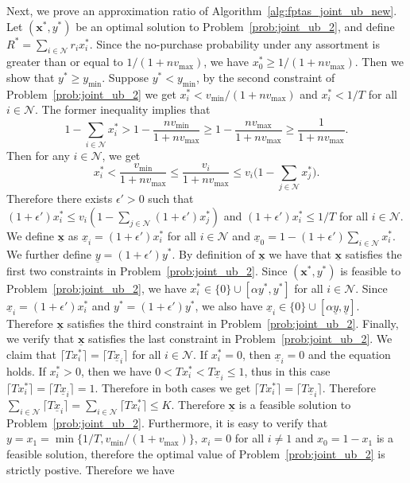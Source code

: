 \documentclass[mnsc,non-blindrev]{informs3}
\theoremstyle{definition}
\begin{document}
\begin{appendices}{\Large{}}
{Next, we prove an approximation ratio of Algorithm~\ref{alg:fptas_joint_ub_new}. Let $(\bm{x}^*,y^*)$ be an optimal solution to Problem~\eqref{prob:joint_ub_2}, and define $R^*=\sum_{i\in\mathcal{N}}r_ix_i^*$. Since the no-purchase probability under any assortment is greater than or equal to $1/(1+nv_{\max})$, we have $x_0^*\geq 1/(1+nv_{\max})$. Then we show that $y^*\geq y_{\min}$. Suppose $y^*<y_{\min}$, by the second constraint of Problem~\eqref{prob:joint_ub_2} we get $x_i^*<v_{\min}/(1+nv_{\max})$ and $x_i^*<1/T$ for all $i\in\mathcal{N}$. The former inequality implies that
\begin{equation*}
1-\sum_{i\in\mathcal{N}}x_i^*>1-\dfrac{nv_{\min}}{1+nv_{\max}}\geq 1-\dfrac{nv_{\max}}{1+nv_{\max}}\geq \dfrac{1}{1+nv_{\max}}.
\end{equation*}
Then for any $i\in\mathcal{N}$, we get
\begin{equation*}
x_i^*<\dfrac{v_{\min}}{1+nv_{\max}}\leq \dfrac{v_i}{1+nv_{\max}}\leq v_i\Big(1-\sum_{j\in\mathcal{N}}x_j^*\Big).
\end{equation*}
Therefore there exists $\epsilon'>0$ such that $(1+\epsilon')x_i^*\leq v_i(1-\sum_{j\in\mathcal{N}}(1+\epsilon')x_j^*)$ and $(1+\epsilon')x_i^*\leq 1/T$ for all $i\in\mathcal{N}$. We define $\underline{\bm{x}}$ as $\underline{x}_i=(1+\epsilon')x_i^*$ for all $i\in\mathcal{N}$ and $\underline{x}_0=1-(1+\epsilon')\sum_{i\in\mathcal{N}}x_i^*$. We further define $\underline{y}=(1+\epsilon')y^*$. By definition of $\underline{\bm{x}}$ we have that $\underline{\bm{x}}$ satisfies the first two constraints in Problem~\eqref{prob:joint_ub_2}. Since $(\bm{x}^*,y^*)$ is feasible to Problem~\eqref{prob:joint_ub_2}, we have $x_i^*\in \{0\}\cup[\alpha y^*,y^*]$ for all $i\in\mathcal{N}$. Since $\underline{x}_i=(1+\epsilon')x_i^*$ and $y^*=(1+\epsilon')y^*$, we also have $\underline{x}_i\in\{0\}\cup[\alpha\underline{y},\underline{y}]$. Therefore $\underline{\bm{x}}$ satisfies the third constraint in Problem~\eqref{prob:joint_ub_2}. Finally, we verify that $\underline{\bm{x}}$ satisfies the last constraint in Problem~\eqref{prob:joint_ub_2}. We claim that $\lceil Tx_i^*\rceil=\lceil T\underline{x}_i\rceil$ for all $i\in\mathcal{N}$. If $x_i^*=0$, then $\underline{x}_i=0$ and the equation holds. If $x_i^*>0$, then we have $0<Tx_i^*<T\underline{x}_i\leq 1$, thus in this case $\lceil Tx_i^*\rceil=\lceil T\underline{x}_i\rceil=1$. Therefore in both cases we get $\lceil Tx_i^*\rceil=\lceil T\underline{x}_i\rceil$. Therefore $\sum_{i\in\mathcal{N}}\lceil T\underline{x}_i\rceil=\sum_{i\in\mathcal{N}}\lceil Tx_i^*\rceil\leq K$. Therefore $\underline{\bm{x}}$ is a feasible solution to Problem~\eqref{prob:joint_ub_2}. Furthermore, it is easy to verify that $y=x_1=\min\{1/T,v_{\min}/(1+v_{\max})\}$, $x_i=0$ for all $i\neq 1$ and $x_0=1-x_1$ is a feasible solution, therefore the optimal value of Problem~\eqref{prob:joint_ub_2} is strictly postive. Therefore we have
}
\end{appendices}
\end{document}
